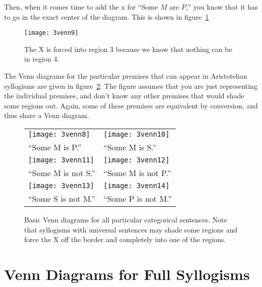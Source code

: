 Then, when it comes time to add the x for ``Some $M$ are $P$,'' you know that it has to go in the exact center of the diagram. This is shown in figure~\ref{fig:vennforcedtocenter}

\begin{figure}[!ht]\centering
\texttt{[image: 3venn9]}
\caption{The X is forced into region 3 because we know that nothing can be in region 4.}
\label{fig:vennforcedtocenter}
\end{figure}

The Venn diagrams for the particular premises that can appear in Aristotelian syllogisms are given in figure~\ref{fig:part_venns}. The figure assumes that you are just representing the individual premises, and don't know any other premises that would shade some regions out. Again, some of these premises are equivalent by conversion, and thus share a Venn diagram.

\begin{figure}[!ht]
\centering
\begin{tabu}{X[1,c] X[1,c]}
\texttt{[image: 3venn8]} &
\texttt{[image: 3venn10]} \\
``Some M is P.'' & ``Some M is S.'' \\
\texttt{[image: 3venn11]} &
\texttt{[image: 3venn12]} \\
``Some M is not S.'' & ``Some M is not P.'' \\
\texttt{[image: 3venn13]} &
\texttt{[image: 3venn14]} \\
``Some S is not M.'' & ``Some P is not M.'' \\
\end{tabu}
\caption{Basic Venn diagrams for all particular categorical sentences. Note that syllogisms with universal sentences may shade some regions and force the X off the border and completely into one of the regions.}
\label{fig:part_venns}
\end{figure}

\section{Venn Diagrams for Full Syllogisms}


